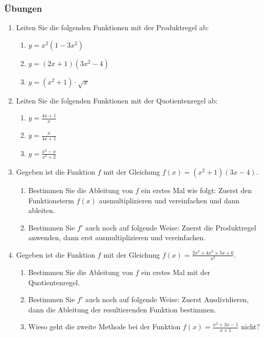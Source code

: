 \subsubsection*{Übungen}
\begin{enumerate}
    \item Leiten Sie die folgenden Funktionen mit der Produktregel ab:
          \begin{enumerate}
              \item $y= x^2(1-3x^2)$
              \item $y= (2x+1)(3x^2-4)$
              \item $y= (x^2+1) \cdot \sqrt{x}$
          \end{enumerate}



    \item Leiten Sie die folgenden Funktionen mit der Quotientenregel ab:
          \begin{enumerate}
              \item $y= \frac{4x+1}{x}$
              \item $y= \frac{x}{4x+1}$
              \item $y= \frac{x^2-x}{x^3+2}$
          \end{enumerate}

    \item Gegeben ist die Funktion \( f \) mit der Gleichung \( f(x) = (x^2 + 1)(3x - 4) \).
          \begin{enumerate}
              \item Bestimmen Sie die Ableitung von \( f \) ein erstes Mal wie folgt: Zuerst den Funktionsterm \( f(x) \) ausmultiplizieren und vereinfachen und dann ableiten.
              \item Bestimmen Sie \( f' \) auch noch auf folgende Weise: Zuerst die Produktregel anwenden, dann erst ausmultiplizieren und vereinfachen.
          \end{enumerate}

    \item Gegeben ist die Funktion \( f \) mit der Gleichung \( f(x) = \frac{2x^3+4x^2+5x+6}{x^2} \).
          \begin{enumerate}
              \item Bestimmen Sie die Ableitung von \( f \) ein erstes Mal mit der Quotientenregel.
              \item Bestimmen Sie \( f' \) auch noch auf folgende Weise: Zuerst Ausdividieren, dann die Ableitung der resultierenden Funktion bestimmen.
              \item Wieso geht die zweite Methode bei der Funktion $f(x) = \frac{x^2+3x-1}{x+1}$ nicht?
          \end{enumerate}



\end{enumerate}
